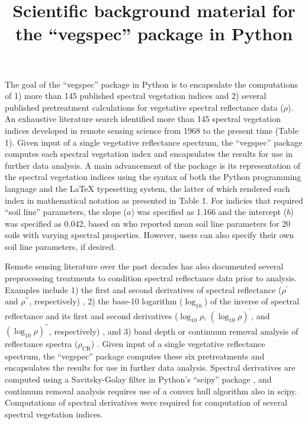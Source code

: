 \documentclass[10pt]{article}
\begin{document}
\title{Scientific background material for the ``vegspec'' package in Python}

\maketitle

The goal of the ``vegspec'' package in Python is to encapsulate the computations of 1) more than 145 published spectral vegetation indices and 2) several published pretreatment calculations for vegetative spectral reflectance data ($\rho$). An exhaustive literature search identified more than 145 spectral vegetation indices developed in remote sensing science from 1968 to the present time (Table 1). Given input of a single vegetative reflectance spectrum, the ``vegspec'' package computes each spectral vegetation index and encapsulates the results for use in further data analysis. A main advancement of the package is its representation of the spectral vegetation indices using the syntax of both the Python programming language and the LaTeX typesetting system, the latter of which rendered each index in mathematical notation as presented in Table 1. For indicies that required ``soil line'' parameters, the slope ($a$) was specified as 1.166 and the intercept ($b$) was specified as 0.042, based on \citet{Huete1984} who reported mean soil line parameters for 20 soils with varying spectral properties. However, users can also specify their own soil line parameters, if desired.

Remote sensing literature over the past decades has also documented several preprocessing treatments to condition spectral reflectance data prior to analysis. Examples include 1) the first and second derivatives of spectral reflectance ($\rho^\prime$ and $\rho^{\prime\prime}$, respectively) \citep{Horler1983}, 2) the base-10 logarithm ($\log_{10}$) of the inverse of spectral reflectance and its first and second derivatives ($\log_{10} \rho$, $(\log_{10} \rho)^\prime$, and $(\log_{10} \rho)^{\prime\prime}$, respectively) \citep{Blackburn1998a,Yoder1995}, and 3) band depth or continuum removal analysis of reflectance spectra ($\rho_{\text{CR}}$) \citep{Curran2001,Huang2004,Kokaly1999}. Given input of a single vegetative reflectance spectrum, the ``vegspec'' package computes these six pretreatments and encapsulates the results for use in further data analysis. Spectral derivatives are computed using a Savitsky-Golay filter in Python’s ``scipy'' package \citep{Virtanen2020}, and continuum removal analysis requires use of a convex hull algorithm also in scipy. Computations of spectral derivatives were required for computation of several spectral vegetation indices.
\end{document}
